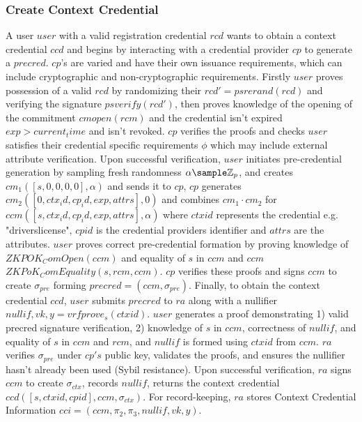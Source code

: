 \newpage
\subsubsection{Create Context Credential}
A user $user$ with a valid registration credential $rcd$ wants to obtain a context credential $ccd$ and begins by interacting with a credential provider $cp$ to generate a $precred$. $cp$'s are varied and have their own issuance requirements, which can include cryptographic and non-cryptographic requirements.
Firstly $user$ proves possession of a valid $rcd$ by randomizing their $rcd' = psrerand(rcd)$ and verifying the signature $psverify(rcd')$, then proves knowledge of the opening of the commitment $cmopen(rcm)$ and the credential isn't expired $exp > current_time$ and isn't revoked. $cp$ verifies the proofs and checks $user$ satisfies their credential specific requirements $\phi$ which may include external attribute verification.
Upon successful verification, $user$ initiates pre-credential generation by sampling fresh randomness $\alpha \sample \Z_p$, and creates $cm_1([s, 0, 0, 0, 0], \alpha)$ and sends it to $cp$, $cp$ generates $cm_2([0, ctx_id, cp_id, exp, attrs],0)$ and combines $cm_1 \cdot cm_2$ for $ccm([s, ctx_id, cp_id, exp, attrs], \alpha)$ where $ctxid$ represents the credential e.g. "driverslicense", $cpid$ is the credential providers identifier and $attrs$ are the attributes. $user$ proves correct pre-credential formation by proving knowledge of $ZKPOK_ComOpen(ccm)$ and equality of $s$ in $ccm$ and $ccm$ $ZKPoK_ComEquality(s, rcm, ccm)$. $cp$ verifies these proofs and signs $ccm$ to create $\sigma_{pre}$ forming $precred = (ccm, \sigma_{pre})$.
Finally, to obtain the context credential $ccd$, $user$ submits $precred$ to $ra$ along with a nullifier $nullif, vk, y = vrfprove_{s}(ctxid)$. $user$ generates a proof demonstrating 1) valid precred signature verification, 2) knowledge of $s$ in $ccm$, correctness of $nullif$, and equality of $s$ in $ccm$ and $rcm$, and $nullif$ is formed using $ctxid$ from $ccm$.
$ra$ verifies $\sigma_{pre}$ under $cp's$ public key, validates the proofs, and ensures the nullifier hasn't already been used (Sybil resistance). Upon successful verification, $ra$ signs $ccm$ to create $\sigma_{ctx}$, records $nullif$, returns the context credential $ccd([s, ctxid, cpid], ccm, \sigma_{ctx})$.
For record-keeping, $ra$ stores Context Credential Information $cci = (ccm, \pi_2, \pi_3, nullif, vk, y)$.



